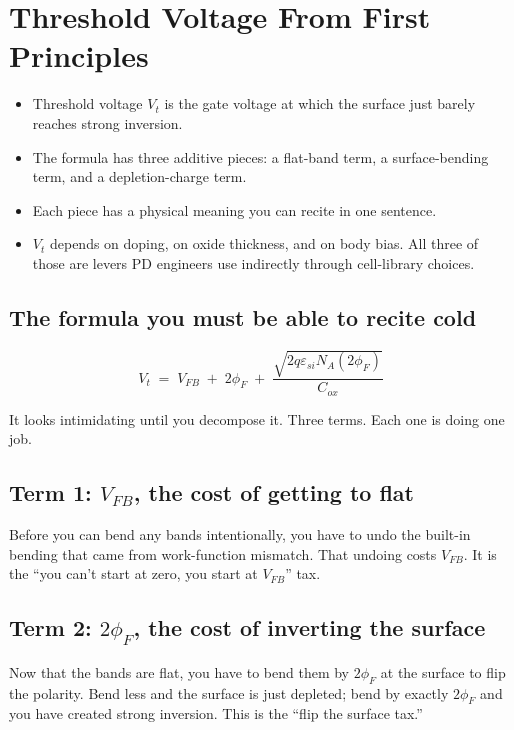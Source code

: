 \documentclass[11pt]{article}
\begin{document}
\section{Threshold Voltage From First Principles}
\label{sec:vt}

\begin{tldr}
\begin{itemize}[leftmargin=*]
\item Threshold voltage $V_t$ is the gate voltage at which the surface just barely reaches strong inversion.
\item The formula has three additive pieces: a flat-band term, a surface-bending term, and a depletion-charge term.
\item Each piece has a physical meaning you can recite in one sentence.
\item $V_t$ depends on doping, on oxide thickness, and on body bias. All three of those are levers PD engineers use indirectly through cell-library choices.
\end{itemize}
\end{tldr}

\subsection{The formula you must be able to recite cold}

\begin{equation}
\boxed{V_t \;=\; V_{FB} \;+\; 2\phi_F \;+\; \frac{\sqrt{2q\varepsilon_{si} N_A (2\phi_F)}}{C_{ox}}}
\end{equation}

It looks intimidating until you decompose it. Three terms. Each one is doing one job.

\subsection{Term 1: $V_{FB}$, the cost of getting to flat}

Before you can bend any bands intentionally, you have to undo the built-in bending that came from work-function mismatch. That undoing costs $V_{FB}$. It is the ``you can't start at zero, you start at $V_{FB}$'' tax.

\subsection{Term 2: $2\phi_F$, the cost of inverting the surface}

Now that the bands are flat, you have to bend them by $2\phi_F$ at the surface to flip the polarity. Bend less and the surface is just depleted; bend by exactly $2\phi_F$ and you have created strong inversion. This is the ``flip the surface tax.''
\end{document}
